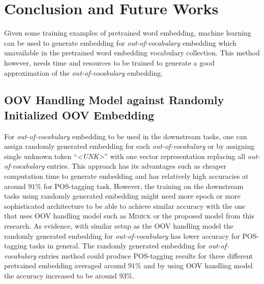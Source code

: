 \chapter{Conclusion and Future Works}
\label{chap:conc}

Given some training examples of pretrained word embedding, machine
learning can be used to generate embedding for
\textit{out-of-vocabulary} embedding which unavailable in the
pretrained word embedding vocabulary collection. This method however,
needs time and resources to be trained to generate a good
approximation of the \textit{out-of-vocabulary} embedding.

\section{OOV Handling Model against Randomly Initialized OOV Embedding}
For \textit{out-of-vocabulary} embedding to be used in the downstream
tasks, one can assign randomly generated embedding for each
\textit{out-of-vocabulary} or by assigning single unknown token
``\textit{\textless UNK\textgreater}'' with one vector representation
replacing all \textit{out-of-vocabulary} entries. This approach has
its advantages such as cheaper computation time to generate embedding
and has relatively high accuracies at around $91\%$ for POS-tagging
task. However, the training on the downstream tasks using randomly
generated embedding might need more epoch or more sophisticated
architecture to be able to achieve similar accuracy with the one that
uses OOV handling model such as \textsc{Mimick} or the proposed model
from this research. As evidence, with similar setup as the OOV
handling model the randomly generated embedding for
\textit{out-of-vocabulary} has lower accuracy for POS-tagging tasks in
general. The randomly generated embedding for
\textit{out-of-vocabulary} entries method could produce POS-tagging
results for three different pretrained embedding averaged around
$91\%$ and by using OOV handling model the accuracy increased to be
around $93\%$.

